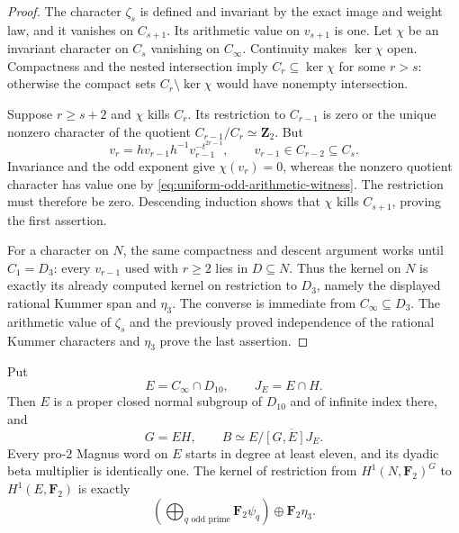 \begin{proof}
The character $\zeta_s$ is defined and invariant by the exact image
and weight law, and it vanishes on $C_{s+1}$. Its arithmetic value
on $v_{s+1}$ is one.
Let $\chi$ be an invariant character on $C_s$ vanishing on
$C_\infty$. Continuity makes $\ker\chi$ open. Compactness and the
nested intersection imply $C_r\subseteq\ker\chi$ for some
$r>s$: otherwise the compact sets $C_r\setminus\ker\chi$ would
have nonempty intersection.

Suppose $r\ge s+2$ and $\chi$ kills $C_r$. Its restriction to
$C_{r-1}$ is zero or the unique nonzero character of the quotient
$C_{r-1}/C_r\simeq\mathbf Z_2$. But
\[
 v_r=h v_{r-1}h^{-1}v_{r-1}^{-t^{2r-1}},
 \qquad v_{r-1}\in C_{r-2}\subseteq C_s.
\]
Invariance and the odd exponent give $\chi(v_r)=0$, whereas the
nonzero quotient character has value one by
\eqref{eq:uniform-odd-arithmetic-witness}. The restriction must
therefore be zero. Descending induction shows that $\chi$ kills
$C_{s+1}$, proving the first assertion.

For a character on $N$, the same compactness and descent argument
works until $C_1=D_3$: every $v_{r-1}$ used with $r\ge2$ lies
in $D\subseteq N$. Thus the kernel on $N$ is exactly its already
computed kernel on restriction to $D_3$, namely the displayed
rational Kummer span and $\eta_3$. The converse is immediate from
$C_\infty\subseteq D_3$. The arithmetic value of $\zeta_s$ and
the previously proved independence of the rational Kummer
characters and $\eta_3$ prove the last assertion.
\end{proof}

\begin{corollary}\label{cor:dyadic-metabelian-deep-gate}
Put
\[
 E=C_\infty\cap D_{10},\qquad J_E=E\cap H.
\]
Then $E$ is a proper closed normal subgroup of $D_{10}$ and of
infinite index there, and
\[
 G=EH,\qquad B\simeq E/\overline{[G,E]J_E}.
\]
Every pro-$2$ Magnus word on $E$ starts in degree at least eleven,
and its dyadic beta multiplier is identically one.
The kernel of restriction from $H^1(N,\mathbf F_2)^G$ to
$H^1(E,\mathbf F_2)$ is exactly
\[
 \left(\bigoplus_{q\text{ odd prime}}\mathbf F_2\psi_q\right)
                   \oplus\mathbf F_2\eta_3.
\]
\end{corollary}


